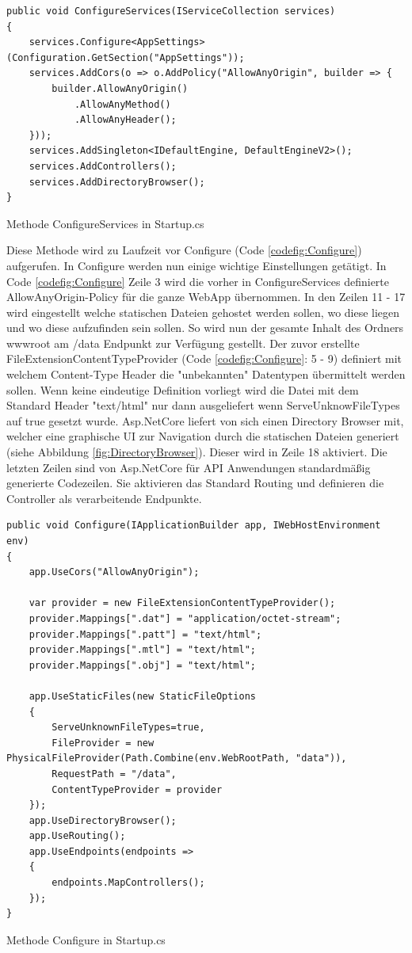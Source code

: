 \begin{codefig}
	\centering
	\lstset{style=sharpc}
	\begin{lstlisting}
public void ConfigureServices(IServiceCollection services)
{
	services.Configure<AppSettings>(Configuration.GetSection("AppSettings"));	
	services.AddCors(o => o.AddPolicy("AllowAnyOrigin", builder => {
		builder.AllowAnyOrigin()
			.AllowAnyMethod()
			.AllowAnyHeader();
	}));
	services.AddSingleton<IDefaultEngine, DefaultEngineV2>();
	services.AddControllers();
	services.AddDirectoryBrowser();
}
	\end{lstlisting}
	\caption{Methode ConfigureServices in Startup.cs}
	\label{codefig:ConfigureServices}
\end{codefig}
Diese Methode wird zu Laufzeit vor Configure (Code \ref{codefig:Configure}) aufgerufen. In Configure werden nun einige wichtige Einstellungen getätigt. In Code \ref{codefig:Configure} Zeile 3 wird die vorher in ConfigureServices definierte \grqq AllowAnyOrigin\grqq -Policy für die ganze WebApp übernommen. In den Zeilen 11 - 17 wird eingestellt welche statischen Dateien gehostet werden sollen, wo diese liegen und wo diese aufzufinden sein sollen. So wird nun der gesamte Inhalt des Ordners wwwroot am /data Endpunkt zur Verfügung gestellt. Der zuvor erstellte FileExtensionContentTypeProvider (Code \ref{codefig:Configure}: 5 - 9) definiert mit welchem Content-Type Header die "unbekannten" Datentypen übermittelt werden sollen. Wenn keine eindeutige Definition vorliegt wird die Datei mit dem Standard Header "text/html" nur dann ausgeliefert wenn ServeUnknowFileTypes auf true gesetzt wurde.
Asp.NetCore liefert von sich einen Directory Browser mit, welcher eine graphische UI zur Navigation durch die statischen Dateien generiert (siehe Abbildung \ref{fig:DirectoryBrowser}). Dieser wird in Zeile 18 aktiviert. Die letzten Zeilen sind von Asp.NetCore für API Anwendungen standardmäßig generierte Codezeilen. Sie aktivieren das Standard Routing und definieren die Controller als verarbeitende Endpunkte.\\
\begin{codefig}
	\centering
	\lstset{style=sharpc}
	\begin{lstlisting}
public void Configure(IApplicationBuilder app, IWebHostEnvironment env)
{
	app.UseCors("AllowAnyOrigin");

	var provider = new FileExtensionContentTypeProvider();
	provider.Mappings[".dat"] = "application/octet-stream";
	provider.Mappings[".patt"] = "text/html";
	provider.Mappings[".mtl"] = "text/html";
	provider.Mappings[".obj"] = "text/html";

	app.UseStaticFiles(new StaticFileOptions
	{
		ServeUnknownFileTypes=true,
		FileProvider = new PhysicalFileProvider(Path.Combine(env.WebRootPath, "data")),
		RequestPath = "/data",
		ContentTypeProvider = provider
	});
	app.UseDirectoryBrowser();
	app.UseRouting();
	app.UseEndpoints(endpoints =>
	{
		endpoints.MapControllers();
	});
}
	\end{lstlisting}
	\caption{Methode Configure in Startup.cs}
	\label{codefig:Configure}
\end{codefig}

